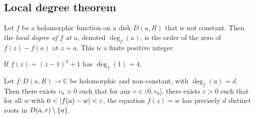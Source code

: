 \subsection{Local degree theorem}
\begin{definition}
	Let \( f \) be a holomorphic function on a disk \( D(a,R) \) that is not constant.
	Then the \textit{local degree of \( f \) at \( a \)}, denoted \( \deg_f(a) \), is the order of the zero of \( f(z) - f(a) \) at \( z = a \).
	This is a finite positive integer.
\end{definition}
\begin{example}
	If \( f(z) = (z-1)^4 + 1 \) has \( \deg_f(1) = 4 \).
\end{example}
\begin{theorem}
	Let \( f \colon D(a,R) \to \mathbb C \) be holomorphic and non-constant, with \( \deg_f(a) = d \).
	Then there exists \( r_0 > 0 \) such that for any \( r \in (0,r_0] \), there exists \( \varepsilon > 0 \) such that for all \( w \) with \( 0 < \abs{f(a) - w} < \varepsilon \), the equation \( f(z) = w \) has precisely \( d \) distinct roots in \( D(a,r) \setminus \qty{a} \).
\end{theorem}
